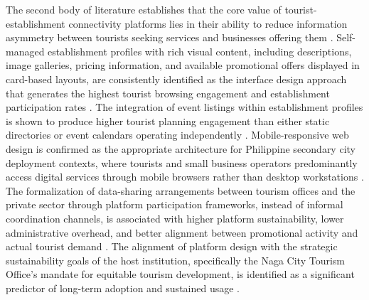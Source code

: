\documentclass{research}
\begin{document}
The second body of literature establishes that the core value of
tourist-establishment connectivity platforms lies in their ability to
reduce information asymmetry between tourists seeking services and
businesses offering them \cite{kim2023, buhalis2020, untourism2024}.
Self-managed establishment profiles with rich visual content, including
descriptions, image galleries, pricing information, and available
promotional offers displayed in card-based layouts, are consistently
identified as the interface design approach that generates the highest
tourist browsing engagement and establishment participation rates
\cite{li2024, santos2023, xiang2021}. The integration of event listings
within establishment profiles is shown to produce higher tourist planning
engagement than either static directories or event calendars operating
independently \cite{zhang2022cloud}. Mobile-responsive web design is
confirmed as the appropriate architecture for Philippine secondary city
deployment contexts, where tourists and small business operators
predominantly access digital services through mobile browsers rather
than desktop workstations \cite{dictwifi, pwc2021}. The formalization
of data-sharing arrangements between tourism offices and the private
sector through platform participation frameworks, instead of informal
coordination channels, is associated with higher platform sustainability,
lower administrative overhead, and better alignment between promotional
activity and actual tourist demand \cite{say2025, adb2025, hidayat2023a,
buhalis2023}. The alignment of platform design with the strategic
sustainability goals of the host institution, specifically the Naga
City Tourism Office's mandate for equitable tourism development,
is identified as a significant predictor of long-term adoption and
sustained usage \cite{wang2024b, jarupunphol2025}.
\end{document}

